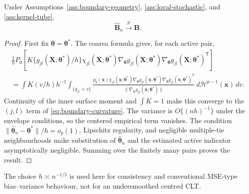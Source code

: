 \begin{theorem}
\label{thm:boundary-estimator-consistency}
Under Assumptions~\ref{ass:boundary-geometry},
\ref{ass:local-stochastic}, and \ref{ass:kernel-tube},
\begin{equation}
 \widehat{\mathbf{B}}_n\xrightarrow{p}\mathbf{B}.
 \label{eq:boundary-estimator-consistency}
\end{equation}
\end{theorem}

\begin{proof}
First fix $\boldsymbol{\theta}=\boldsymbol{\theta}^*$.  The coarea formula gives, for each active pair,
\begin{multline*}
 \frac1hP_0\left[
 K\{g_{jl}(\mathbf{X};\boldsymbol{\theta}^*)/h\}\chi_{jl}(\mathbf{X};\boldsymbol{\theta}^*)
 \nabla_{\boldsymbol{\theta}}g_{jl}(\mathbf{X};\boldsymbol{\theta}^*)\nabla_{\boldsymbol{\theta}}g_{jl}(\mathbf{X};\boldsymbol{\theta}^*)^\mathsf T
 \right]\\
 =\int K(v/h)h^{-1}
 \int_{\{g_{jl}=v\}}
 \frac{p_0(\mathbf{x})\chi_{jl}(\mathbf{x};\boldsymbol{\theta}^*)
 \nabla_{\boldsymbol{\theta}}g_{jl}(\mathbf{x};\boldsymbol{\theta}^*)\nabla_{\boldsymbol{\theta}}g_{jl}(\mathbf{x};\boldsymbol{\theta}^*)^\mathsf T}
 {\|\nabla_{\mathbf{x}}g_{jl}(\mathbf{x};\boldsymbol{\theta}^*)\|}
 \,d\mathcal H^{p-1}(\mathbf{x})\,dv.
\end{multline*}
Continuity of the inner surface moment and $\int K=1$ make this converge to
the $(j,l)$ term of \eqref{eq:boundary-curvature}.  The variance is
$O\{(nh)^{-1}\}$ under the envelope conditions, so the centered empirical
term vanishes.  The condition
$\|\widehat{\boldsymbol{\theta}}_n-\boldsymbol{\theta}^*\|/h=o_p(1)$, Lipschitz regularity, and negligible
multiple-tie neighbourhoods make substitution of $\widehat{\boldsymbol{\theta}}_n$ and the
estimated active indicator asymptotically negligible.  Summing over the
finitely many pairs proves the result.
\end{proof}

The choice $h\asymp n^{-1/5}$ is used here for consistency and conventional
MSE-type bias--variance behaviour, not for an undersmoothed centred CLT.

